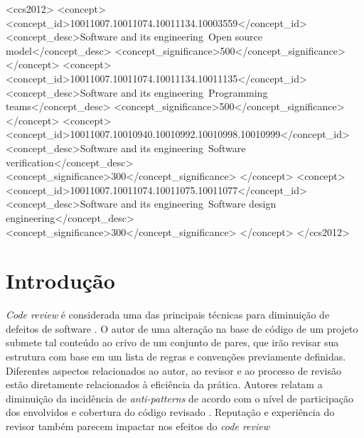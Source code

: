 \documentclass[sigconf]{acmart}
\begin{document}
\begin{CCSXML}
<ccs2012>
<concept>
<concept_id>10011007.10011074.10011134.10003559</concept_id>
<concept_desc>Software and its engineering~Open source model</concept_desc>
<concept_significance>500</concept_significance>
</concept>
<concept>
<concept_id>10011007.10011074.10011134.10011135</concept_id>
<concept_desc>Software and its engineering~Programming teams</concept_desc>
<concept_significance>500</concept_significance>
</concept>
<concept>
<concept_id>10011007.10010940.10010992.10010998.10010999</concept_id>
<concept_desc>Software and its engineering~Software verification</concept_desc>
<concept_significance>300</concept_significance>
</concept>
<concept>
<concept_id>10011007.10011074.10011075.10011077</concept_id>
<concept_desc>Software and its engineering~Software design engineering</concept_desc>
<concept_significance>300</concept_significance>
</concept>
</ccs2012>
\end{CCSXML}




\maketitle

\section{Introdução}

\textit{Code review} é considerada uma das principais técnicas para diminuição de defeitos de software \cite{Boehm2001}. O autor de uma alteração na base de código de um projeto submete tal conteúdo ao crivo de um conjunto de pares, que irão revisar sua estrutura com base em um lista de regras e convenções previamente definidas. Diferentes aspectos relacionados ao autor, ao revisor e ao processo de revisão estão diretamente relacionados à eficiência da prática. Autores relatam a diminuição da incidência de \textit{anti-patterns} \cite{Kemerer2009} de acordo com o nível de participação dos envolvidos e cobertura do código revisado \cite{Meneely201437, Morales2015171, Bavota201581}. Reputação \cite{Baysal2013122, Bosu2014} e experiência \cite{Kononenko2015111} do revisor também parecem impactar nos efeitos do \textit{code review}
\end{document}
